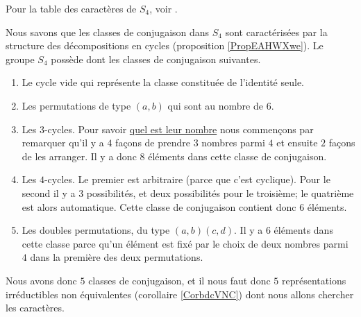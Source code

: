 Pour la table des caractères de \( S_4\), voir \cite{KXjFWKA}.

Nous savons que les classes de conjugaison dans \( S_4\) sont caractérisées par la structure des décompositions en cycles (proposition \ref{PropEAHWXwe}). Le groupe \( S_4\) possède dont les classes de conjugaison suivantes.
\begin{enumerate}
    \item
        Le cycle vide qui représente la classe constituée de l'identité seule.
    \item
        Les permutations de type \( (a,b)\) qui sont au nombre de \( 6\).
    \item
        Les \( 3\)-cycles. Pour savoir \href{http://www.toujourspret.com/techniques/expression/chants/C/cantique_des_etoiles.php}{quel est leur nombre} nous commençons par remarquer qu'il y a \( 4\) façons de prendre \( 3\) nombres parmi \( 4\) et ensuite \( 2\) façons de les arranger. Il y a donc \( 8\) éléments dans cette classe de conjugaison.
    \item
        Les \( 4\)-cycles. Le premier est arbitraire (parce que c'est cyclique). Pour le second il y a \( 3\) possibilités, et deux possibilités pour le troisième; le quatrième est alors automatique. Cette classe de conjugaison contient donc \( 6\) éléments.
    \item
        Les doubles permutations, du type \( (a,b)(c,d)\). Il y a \( 6\) éléments dans cette classe parce qu'un élément est fixé par le choix de deux nombres parmi \( 4\) dans la première des deux permutations.
\end{enumerate}

Nous avons donc \( 5\) classes de conjugaison, et il nous faut donc \( 5\) représentations irréductibles non équivalentes (corollaire \ref{CorbdcVNC}) dont nous allons chercher les caractères. 

